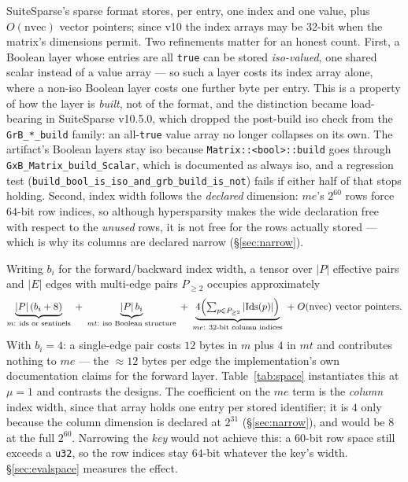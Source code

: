 \documentclass[11pt,a4paper]{article}
\theoremstyle{plain}
\theoremstyle{definition}
\theoremstyle{remark}
\begin{document}
SuiteSparse's sparse format stores, per entry, one index and one value, plus
$O(\mathrm{nvec})$ vector pointers; since v10 the index arrays may be 32-bit
when the matrix's dimensions permit. Two refinements matter for an honest
count. First, a Boolean layer whose entries are all \texttt{true} can be
stored \emph{iso-valued}, one shared scalar instead of a value array --- so
such a layer costs its index array alone, where a non-iso Boolean layer costs
one further byte per entry. This is a property of how the layer is
\emph{built}, not of the format, and the distinction became load-bearing in
SuiteSparse v10.5.0, which dropped the post-build iso check from the
\texttt{GrB\_*\_build} family: an all-\texttt{true} value array no longer
collapses on its own. The artifact's Boolean layers stay iso because
\texttt{Matrix::<bool>::build} goes through \texttt{GxB\_Matrix\_build\_Scalar},
which is documented as always iso, and a regression test
(\texttt{build\_bool\_is\_iso\_and\_grb\_build\_is\_not}) fails if either half
of that stops holding. Second, index width follows the \emph{declared}
dimension: $me$'s $2^{60}$ rows force $64$-bit row indices, so although
hypersparsity makes the wide declaration free with respect to the
\emph{unused} rows, it is not free for the rows actually stored --- which is why
its columns are declared narrow (\S\ref{sec:narrow}).

Writing $b_i$ for the forward/backward index width, a tensor over $|P|$
effective pairs and $|E|$ edges with multi-edge pairs $P_{\ge 2}$ occupies
approximately
\[
  \underbrace{|P|\,(b_i + 8)}_{m:\ \text{ids or sentinels}}
  \;+\; \underbrace{|P|\,b_i}_{mt:\ \text{iso Boolean structure}}
  \;+\; \underbrace{4\Bigl(\textstyle\sum_{p \in P_{\ge 2}} |\mathrm{Ids}(p)|\Bigr)}_{me:\ \text{32-bit column indices}}
  \;+\; O(\mathrm{nvec}) \ \text{vector pointers} .
\]
With $b_i = 4$: a single-edge pair costs $12$ bytes in $m$ plus $4$ in $mt$
and contributes nothing to $me$ --- the $\approx 12$ bytes per edge the
implementation's own documentation claims for the forward layer.
Table~\ref{tab:space} instantiates this at $\mu = 1$ and contrasts the
designs. The coefficient on the $me$ term is the \emph{column} index width,
since that array holds one entry per stored identifier; it is $4$ only because
the column dimension is declared at $2^{31}$ (\S\ref{sec:narrow}), and would be
$8$ at the full $2^{60}$. Narrowing the \emph{key} would not achieve this: a
$60$-bit row space still exceeds a \texttt{u32}, so the row indices stay
$64$-bit whatever the key's width. \S\ref{sec:evalspace} measures the effect.
\end{document}
